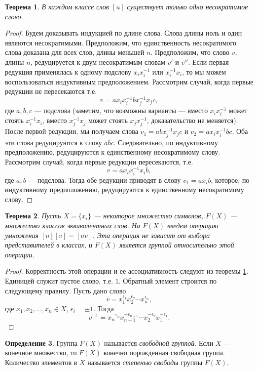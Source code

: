 \documentclass[12pt, titlepage, oneside]{amsbook}
\newtheorem{theorem}{Теорема}[chapter]
\theoremstyle{definition}
\newtheorem{definition}[theorem]{Определение}
\theoremstyle{remark}
\begin{document}
\begin{theorem}
	\label{SvGr5} В каждом классе слов $[u]$ существует только одно несократимое слово.
\end{theorem}

\begin{proof}
	Будем доказывать индукцией по длине слова. Слова длины ноль и один являются несократимыми. Предположим, что единственность несократимого слова доказана для всех слов, длины меньшей $n$. Предположим, что слово $v$, длины $n$, редуцируется к двум несократимым словам $v'$ и $v''$. Если первая редукция применялась к одному подслову $x_i x^{-1}_i$ или $x^{-1}_ix_i$, то мы можем воспользоваться индуктивным предположением. Рассмотрим случай, когда первые редукции не пересекаются т.е. $$v=ax_i x^{-1}_ib x^{-1}_jx_jc,$$ где $a,b,c$ --- подслова (заметим, что возможны варианты --- вместо $x_i x^{-1}_i$ может стоять $x^{-1}_ix_i$, вместо $x^{-1}_jx_j$ может стоять $x_jx^{-1}_j$, доказательство не меняется). После первой редукции, мы получаем слова $v_1=abx^{-1}_jx_jc$ и $v_2=ax_i x^{-1}_ibc$. Оба эти слова редуцируются к слову $abc$. Следовательно, по индуктивному предположению, редуцируются к единственному несократимому слову. Рассмотрим случай, когда первые редукции пересекаются, т.е. $$v=ax_i x^{-1}_ix_ib,$$ где $a,b$ --- подслова. Тогда обе редукции приводят в слову $v_1=ax_ib$, которое, по индуктивному предположению, редуцируются к единственному несократимому слову.
\end{proof}

\begin{theorem}
	\label{SvGr6} Пусть $X=\{x_i\}$ --- некоторое множество символов, $F(X)$ --- множество классов эквивалентных слов. На $F(X)$ введем операцию умножения $[u][v]=[uv]$. Эта операция не зависит от выбора представителей в классах, и $F(X)$ является группой относительно этой операции.
\end{theorem}

\begin{proof}
	Корректность этой операции и ее ассоциативность следуют из теоремы \ref{SvGr5}. Единицей служит пустое слово, т.е. $1$. Обратный элемент строится по следующему правилу. Пусть дано слово $$v=x^{\epsilon_1}_1x^{\epsilon_2}_2\cdots x^{\epsilon_n}_n,$$ где $x_1,x_2,\ldots,x_n\in X$, $\epsilon_i=\pm 1$. Тогда $$v^{-1}=x^{-\epsilon_n}_n x^{-\epsilon_{n-1}}_{n-1}\cdots  x^{-\epsilon_2}_2  x^{-\epsilon_1}_1.$$
\end{proof}

\begin{definition}
	Группа $F(X)$ называется \emph{свободной группой}. Если $X$ --- конечное множество, то $F(X)$ конечно порожденная свободная группа. Количество элементов в $X$ называется \emph{степенью свободы} группы $F(X)$.
\end{definition}
\end{document}
